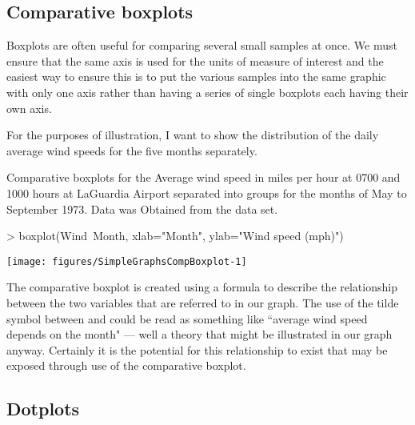 \subsection{Comparative boxplots} 
 
Boxplots are often useful for comparing several small samples at once. We must ensure that the same axis is used for the units of measure of interest and the easiest way to ensure this is to put the various samples into the same graphic with only one axis rather than having a series of single boxplots each having their own axis. 
 
For the purposes of illustration, I want to show the distribution of the daily average wind speeds for the five months separately.  
\begin{exhibit} 
\begin{center} 
\caption{Comparative boxplots for the Average wind speed in miles per hour at 0700 and 1000 hours at LaGuardia Airport separated into groups for the months of May to September 1973. Data was Obtained from the  data set.} 
\label{AirQualityCompBoxplotWindMonth} 
\begin{Schunk}
\begin{Sinput}
> boxplot(Wind~Month, xlab="Month", ylab="Wind speed (mph)") 
\end{Sinput}

\texttt{[image: figures/SimpleGraphsCompBoxplot-1]} \end{Schunk}
\end{center} 
\end{exhibit} 
The comparative boxplot is created using a formula to describe the relationship between the two variables that are referred to in our graph. The use of the tilde symbol between  and  could be read as something like ``average wind speed depends on the month" --- well a theory that might be illustrated in our graph anyway. Certainly it is the potential for this relationship to exist that may be exposed through use of the comparative boxplot. 
 
\subsection{Dotplots} 
 
